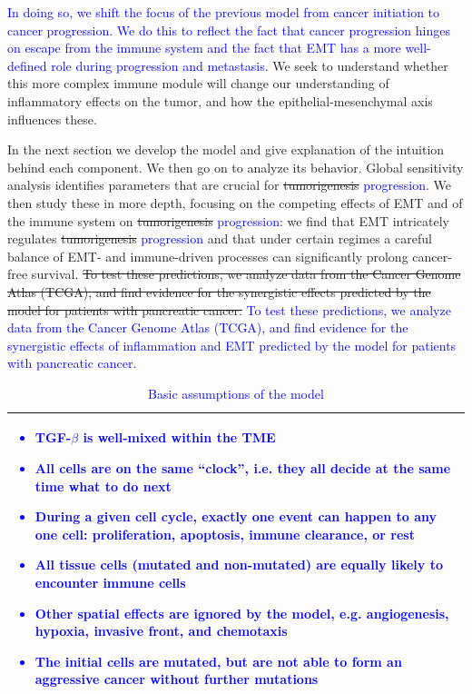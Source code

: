 \documentclass[11pt]{article}
\newcommand{\tcb} { \textcolor{blue} }
\begin{document}
\tcb{
In doing so, we shift the focus of the previous model from cancer initiation to cancer progression.
We do this to reflect the fact that cancer progression hinges on escape from the immune system and the fact that EMT has a more well-defined role during progression and metastasis.
}
We seek to understand whether this more complex immune module will change our understanding of inflammatory effects on the tumor, and how the epithelial-mesenchymal axis influences these.
\par 
In the next section we develop the model and give explanation of the intuition behind each component.
We then go on to analyze its behavior.
Global sensitivity analysis identifies parameters that are crucial for \sout{tumorigenesis} \tcb{progression}.
We then study these in more depth, focusing on the competing effects of EMT and of the immune system on \sout{tumorigenesis} \tcb{progression}: we find that EMT intricately regulates \sout{tumorigenesis} \tcb{progression} and that under certain regimes a careful balance of EMT- and immune-driven processes can significantly prolong cancer-free survival.
\sout{To test these predictions, we analyze data from the Cancer Genome Atlas (TCGA), and find evidence for the synergistic effects predicted by the model for patients with pancreatic cancer.}
\tcb{To test these predictions, we analyze data from the Cancer Genome Atlas (TCGA), and find evidence for the synergistic effects of inflammation and EMT predicted by the model for patients with pancreatic cancer.}


\begin{table}[H]
\begin{tabular}{|p{\textwidth}|}
\hline
\tcb{
\begin{itemize}
\item TGF-$\beta$ is well-mixed within the TME
\item All cells are on the same ``clock'', i.e. they all decide at the same time what to do next
\item During a given cell cycle, exactly one event can happen to any one cell: proliferation, apoptosis, immune clearance, or rest
\item All tissue cells (mutated and non-mutated) are equally likely to encounter immune cells
\item Other spatial effects are ignored by the model, e.g. angiogenesis, hypoxia, invasive front, and chemotaxis
\item The initial cells are mutated, but are not able to form an aggressive cancer without further mutations
\end{itemize}
}
\\
\hline
\end{tabular}
\caption{\tcb{Basic assumptions of the model}}
\label{table:model_assumptions}
\end{table}
\end{document}

